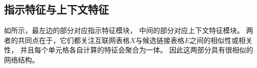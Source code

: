 %




\subsection{指示特征与上下文特征}
\label{sec:cell}

如所示，最左边的部分对应指示特征模块，
中间的部分对应上下文特征模块。
两者的共同点在于，它们都关注互联网表格$X$与候选链接表格$E$之间的相似性或相关性，
并且每个单元格各自计算的特征会聚合为一体。
因此这两部分具有很相似的网络结构。

